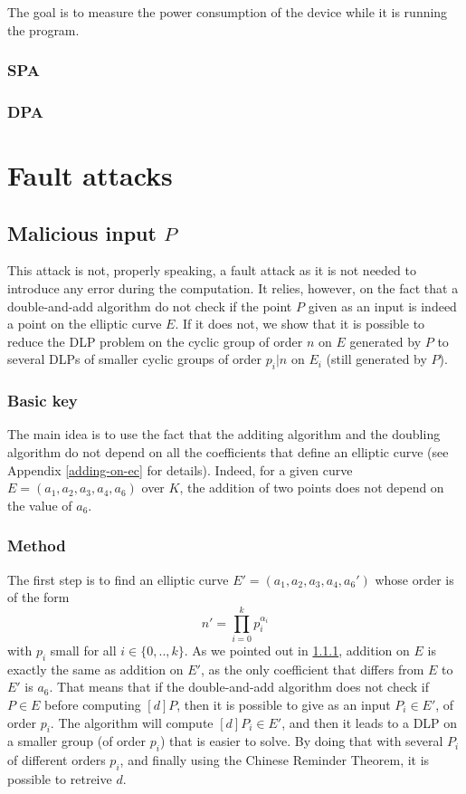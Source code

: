 \documentclass[journal]{IEEEtran}
\begin{document}
The goal is to measure the power consumption of the device while it is running the program.
        \subsubsection{SPA}
        \subsubsection{DPA}
        
\section{Fault attacks}
\label{fault}

\subsection{Malicious input $P$}
This attack is not, properly speaking, a fault attack as it is not needed to introduce any 
error during the computation. It relies, however, on the fact that a double-and-add algorithm 
do not check if the point $P$ given as an input is indeed a point on the elliptic curve $E$.
If it does not, we show that it is possible to reduce the DLP problem on the cyclic group of order $n$ on $E$ generated by $P$ to 
several DLPs of smaller cyclic groups of order $p_i | n$ on $E_i$ (still generated by $P$).\\

\subsubsection{Basic key}
\label{malicious-basic}
The main idea is to use the fact that the additing algorithm and the doubling algorithm do not depend on 
all the coefficients that define an elliptic curve (see Appendix \ref{adding-on-ec} for details).
Indeed, for a given curve $E = (a_1, a_2, a_3, a_4, a_6)$ over $K$, the addition of two points does not
depend on the value of $a_6$.\\

\subsubsection{Method} 
The first step is to find an elliptic curve $E' = (a_1, a_2, a_3, a_4, a_6')$ whose order is of the form
$$n' = \prod_{i = 0}^{k}p_i^{\alpha_i}$$
with $p_i$ small for all $i \in \{0, .., k\}$. As we pointed out in \ref{malicious-basic}, addition on $E$ is 
exactly the same as addition on $E'$, as the only coefficient that differs from $E$ to $E'$ is $a_6$. That means 
that if the double-and-add algorithm does not check if $P \in E$ before computing $[d]P$, then it is possible to 
give as an input $P_i \in E'$, of order $p_i$. The algorithm will compute $[d]P_i \in E'$, and then it leads to a DLP on a smaller 
group (of order $p_i$) that is easier to solve. By doing that with several $P_i$ of different orders $p_i$, and finally using 
the Chinese Reminder Theorem, it is possible to retreive $d$.
\end{document}
